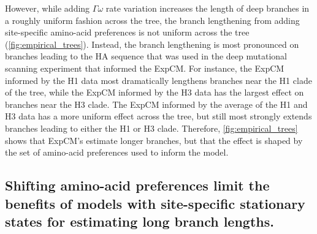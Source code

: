 \documentclass[11pt]{article}
\begin{document}
However, while adding $\Gamma\omega$ rate variation increases the length of deep branches in a roughly uniform fashion across the tree, the branch lengthening from adding site-specific amino-acid preferences is not uniform across the tree (\ref{fig:empirical_trees}). 
Instead, the branch lengthening is most pronounced on branches leading to the HA sequence that was used in the deep mutational scanning experiment that informed the ExpCM.
For instance, the ExpCM informed by the H1 data most dramatically lengthens branches near the H1 clade of the tree, while the ExpCM informed by the H3 data has the largest effect on branches near the H3 clade.
The ExpCM informed by the average of the H1 and H3 data has a more uniform effect across the tree, but still most strongly extends branches leading to either the H1 or H3 clade.
Therefore, \ref{fig:empirical_trees} shows that ExpCM's estimate longer branches, but that the effect is shaped by the set of amino-acid preferences used to inform the model.

\subsection*{Shifting amino-acid preferences limit the benefits of models with site-specific stationary states for estimating long branch lengths.}
\end{document}
